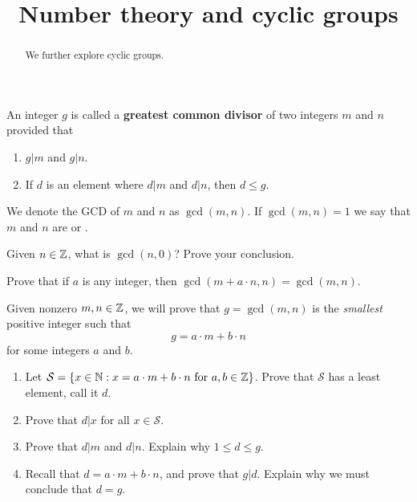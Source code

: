 \documentclass{ximera}
\title{Number theory and cyclic groups}
\begin{document}
\begin{abstract}
  We further explore cyclic groups.
\end{abstract}
\maketitle


\begin{definition} 
An integer $g$ is called a \textbf{greatest common divisor} of two
integers $m$ and $n$ provided that
\begin{enumerate}
\item $g| m$ and $g | n$.
\item If $d$ is an element where $d| m$ and $d | n$, then $d\le g$.
\end{enumerate}
We denote the GCD of $m$ and $n$ as $\gcd(m,n)$. If $\gcd(m,n) = 1$ we
say that $m$ and $n$ are  or .
\end{definition}


\begin{exercise} 
Given $n\in \mathbb Z$, what is $\gcd(n,0)$? Prove your conclusion.
\end{exercise}

\begin{exercise} 
Prove that if $a$ is any integer, then $\gcd(m + a\cdot n, n) =
\gcd(m, n)$.
\end{exercise}




\begin{theorem}\label{T:EL1}
  Given nonzero $m,n\in\mathbb Z$, we will prove that $g=\gcd(m,n)$ is the
  \textit{smallest} positive integer such that
  \[
  g = a\cdot m +b\cdot n
  \]
  for some integers $a$ and $b$.
  \begin{enumerate}
  \item Let $\mathcal S = \{x\in \mathbb N: x = a\cdot m +b\cdot n\text{ for } a,b\in
    \mathbb Z\}$. Prove that $\mathcal S$ has a least element, call it $d$.
  \item Prove that $d| x$ for all $x\in \mathcal S$.
  \item Prove that $d| m$ and $d| n$. Explain why $1 \le d \le g$.
  \item Recall that $d = a\cdot m +b\cdot n$, and prove that $g |
    d$. Explain why we must conclude that $d = g$.
  \end{enumerate}
\end{theorem}
\end{document}
